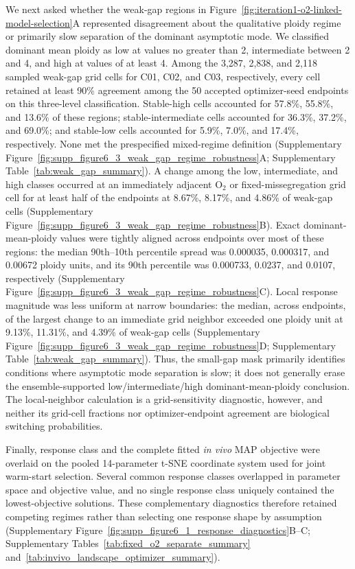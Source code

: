 \documentclass[11pt]{article}
\begin{document}
We next asked whether the weak-gap regions in Figure~\ref{fig:iteration1-o2-linked-model-selection}A represented disagreement about the qualitative ploidy regime or primarily slow separation of the dominant asymptotic mode. We classified dominant mean ploidy as low at values no greater than 2, intermediate between 2 and 4, and high at values of at least 4. Among the 3,287, 2,838, and 2,118 sampled weak-gap grid cells for C01, C02, and C03, respectively, every cell retained at least 90\% agreement among the 50 accepted optimizer-seed endpoints on this three-level classification. Stable-high cells accounted for 57.8\%, 55.8\%, and 13.6\% of these regions; stable-intermediate cells accounted for 36.3\%, 37.2\%, and 69.0\%; and stable-low cells accounted for 5.9\%, 7.0\%, and 17.4\%, respectively. None met the prespecified mixed-regime definition (Supplementary Figure~\ref{fig:supp_figure6_3_weak_gap_regime_robustness}A; Supplementary Table~\ref{tab:weak_gap_summary}). A change among the low, intermediate, and high classes occurred at an immediately adjacent O$_2$ or fixed-missegregation grid cell for at least half of the endpoints at 8.67\%, 8.17\%, and 4.86\% of weak-gap cells (Supplementary Figure~\ref{fig:supp_figure6_3_weak_gap_regime_robustness}B). Exact dominant-mean-ploidy values were tightly aligned across endpoints over most of these regions: the median 90th--10th percentile spread was 0.000035, 0.000317, and 0.00672 ploidy units, and its 90th percentile was 0.000733, 0.0237, and 0.0107, respectively (Supplementary Figure~\ref{fig:supp_figure6_3_weak_gap_regime_robustness}C). Local response magnitude was less uniform at narrow boundaries: the median, across endpoints, of the largest change to an immediate grid neighbor exceeded one ploidy unit at 9.13\%, 11.31\%, and 4.39\% of weak-gap cells (Supplementary Figure~\ref{fig:supp_figure6_3_weak_gap_regime_robustness}D; Supplementary Table~\ref{tab:weak_gap_summary}). Thus, the small-gap mask primarily identifies conditions where asymptotic mode separation is slow; it does not generally erase the ensemble-supported low/intermediate/high dominant-mean-ploidy conclusion. The local-neighbor calculation is a grid-sensitivity diagnostic, however, and neither its grid-cell fractions nor optimizer-endpoint agreement are biological switching probabilities.

Finally, response class and the complete fitted \textit{in vivo} MAP objective were overlaid on the pooled 14-parameter t-SNE coordinate system used for joint warm-start selection. Several common response classes overlapped in parameter space and objective value, and no single response class uniquely contained the lowest-objective solutions. These complementary diagnostics therefore retained competing regimes rather than selecting one response shape by assumption (Supplementary Figure~\ref{fig:supp_figure6_1_response_diagnostics}B--C; Supplementary Tables~\ref{tab:fixed_o2_separate_summary} and~\ref{tab:invivo_landscape_optimizer_summary}).
\end{document}
